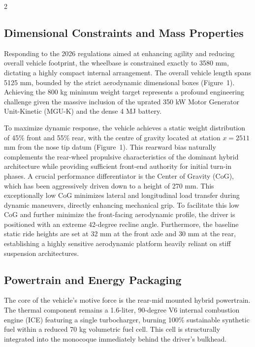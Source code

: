 \begin{multicols}{2}
\subsection{Dimensional Constraints and Mass Properties}

Responding to the 2026 regulations aimed at enhancing agility and reducing overall vehicle footprint, the wheelbase is constrained exactly to 3580 mm, dictating a highly compact internal arrangement. The overall vehicle length spans 5125 mm, bounded by the strict aerodynamic dimensional boxes (Figure~1). Achieving the 800 kg minimum weight target represents a profound engineering challenge given the massive inclusion of the uprated 350 kW Motor Generator Unit-Kinetic (MGU-K) and the dense 4 MJ battery. 

To maximize dynamic response, the vehicle achieves a static weight distribution of 45\% front and 55\% rear, with the centre of gravity located at station $x = 2511$\,mm from the nose tip datum (Figure~1). This rearward bias naturally complements the rear-wheel propulsive characteristics of the dominant hybrid architecture while providing sufficient front-end authority for initial turn-in phases. A crucial performance differentiator is the Center of Gravity (CoG), which has been aggressively driven down to a height of 270 mm. This exceptionally low CoG minimizes lateral and longitudinal load transfer during dynamic maneuvers, directly enhancing mechanical grip. To facilitate this low CoG and further minimize the front-facing aerodynamic profile, the driver is positioned with an extreme 42-degree recline angle. Furthermore, the baseline static ride heights are set at 32 mm at the front axle and 30 mm at the rear, establishing a highly sensitive aerodynamic platform heavily reliant on stiff suspension architectures.

\subsection{Powertrain and Energy Packaging}

The core of the vehicle's motive force is the rear-mid mounted hybrid powertrain. The thermal component remains a 1.6-liter, 90-degree V6 internal combustion engine (ICE) featuring a single turbocharger, burning 100\% sustainable synthetic fuel within a reduced 70 kg volumetric fuel cell. This cell is structurally integrated into the monocoque immediately behind the driver's bulkhead.


\end{multicols}
